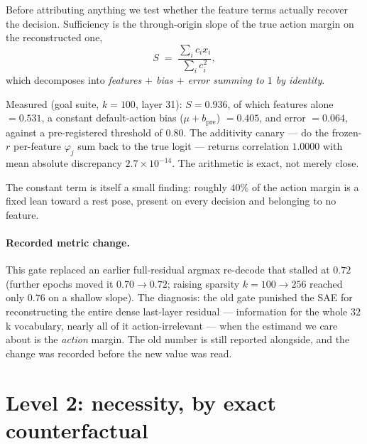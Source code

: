 \documentclass[11pt]{article}
\newcommand{\bpre}{b_{\mathrm{pre}}}
\begin{document}
Before attributing anything we test whether the feature terms actually recover the decision.
Sufficiency is the through-origin slope of the true action margin on the reconstructed one,
\begin{equation}
S \;=\; \frac{\sum_i c_i x_i}{\sum_i c_i^{2}},
\label{eq:suff}
\end{equation}
which decomposes into \emph{features $+$ bias $+$ error summing to $1$ by identity}.

Measured (goal suite, $k=100$, layer 31): $S = \mathbf{0.936}$, of which features alone
$=0.531$, a constant default-action bias ($\mu+\bpre$) $=0.405$, and error $=0.064$, against a
pre-registered threshold of $0.80$. The additivity canary --- do the frozen-$r$ per-feature
$\varphi_j$ sum back to the true logit --- returns correlation $1.0000$ with mean absolute
discrepancy $2.7\times10^{-14}$. The arithmetic is exact, not merely close.

The constant term is itself a small finding: roughly $40\%$ of the action margin is a fixed
lean toward a rest pose, present on every decision and belonging to no feature.

\paragraph{Recorded metric change.} This gate replaced an earlier full-residual argmax
re-decode that stalled at $0.72$ (further epochs moved it $0.70\!\to\!0.72$; raising sparsity
$k=100\!\to\!256$ reached only $0.76$ on a shallow slope). The diagnosis: the old gate punished
the SAE for reconstructing the entire dense last-layer residual --- information for the whole
$32$k vocabulary, nearly all of it action-irrelevant --- when the estimand we care about is the
\emph{action} margin. The old number is still reported alongside, and the change was recorded
before the new value was read.

\section{Level 2: necessity, by exact counterfactual}
\label{sec:necessity}
\end{document}
